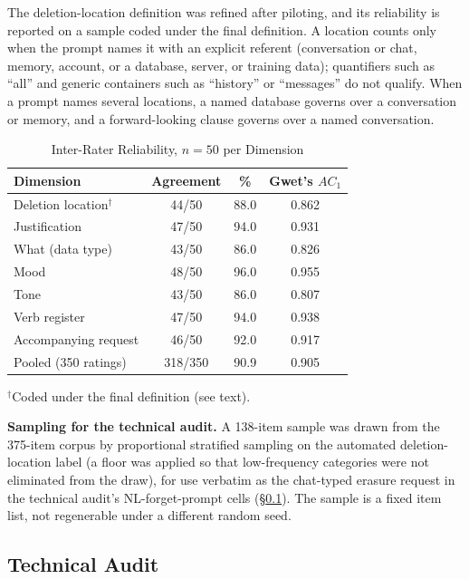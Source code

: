 \documentclass[conference,compsoc]{IEEEtran}
\begin{document}
The deletion-location definition was refined after piloting, and its
reliability is reported on a sample coded under the final definition. A
location counts only when the prompt names it with an explicit referent
(conversation or chat, memory, account, or a database, server, or
training data); quantifiers such as ``all'' and generic containers such
as ``history'' or ``messages'' do not qualify. When a prompt names
several locations, a named database governs over a conversation or
memory, and a forward-looking clause governs over a named conversation.

\begin{table}[t]
\centering
\caption{Inter-Rater Reliability, $n=50$ per Dimension}
\label{tab:ac1}
\small
\begin{tabular}{lccc}
\toprule
Dimension & Agreement & \% & Gwet's $AC_1$ \\
\midrule
Deletion location$^{\dagger}$ & 44/50 & 88.0 & 0.862 \\
Justification           & 47/50 & 94.0 & 0.931 \\
What (data type)        & 43/50 & 86.0 & 0.826 \\
Mood                     & 48/50 & 96.0 & 0.955 \\
Tone                     & 43/50 & 86.0 & 0.807 \\
Verb register            & 47/50 & 94.0 & 0.938 \\
Accompanying request     & 46/50 & 92.0 & 0.917 \\
\midrule
Pooled (350 ratings) & 318/350 & 90.9 & 0.905 \\
\bottomrule
\end{tabular}
\vspace{4pt}

\footnotesize{$^{\dagger}$Coded under the final definition (see text).}
\end{table}

\textbf{Sampling for the technical audit.} A 138-item sample was drawn
from the 375-item corpus by proportional stratified sampling on the
automated deletion-location label (a floor was applied so that
low-frequency categories were not eliminated from the draw), for use
verbatim as the chat-typed erasure request in the technical audit's
NL-forget-prompt cells (\S\ref{sec:audit-methodology}). The sample is a fixed item list, not regenerable under a different random seed.

\subsection{Technical Audit}
\label{sec:audit-methodology}
\end{document}
